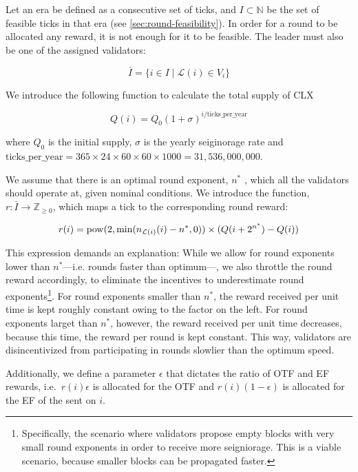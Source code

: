 Let an era be defined as a consecutive set of ticks, and $I\subset\mathbb{N}$ be the set of feasible ticks in that era (see \ref{sec:round-feasibility}). In order for a round to be allocated any reward, it is not enough for it to be feasible. The leader must also be one of the assigned validators:

\begin{equation}
\bar{I}=\{i\in I \mid \mathcal{L}(i) \in V_i\}
\end{equation}

We introduce the following function to calculate the total supply of CLX

\begin{equation}
Q(i) = Q_0 (1+\sigma)^{i/\text{ticks\_per\_year}}
\end{equation}

where $Q_0$ is the initial supply, $\sigma$ is the yearly seiginorage rate and $\text{ticks\_per\_year} = 365\times 24\times 60 \times 60 \times 1000 = 31,\!536,\!000,\!000$.


We assume that there is an optimal round exponent, $n^\ast$ , which all the validators should operate at, given nominal conditions. We introduce the function, $r:\bar{I}\to \mathbb{Z}_{\geq 0}$, which maps a tick to the corresponding round reward:

\begin{equation}
  r(i) = \operatorname*{pow}(2, {\min(n_{\mathcal{L}(i)}(i) - n^\ast, 0)}) \times (Q(i + 2^{n^\ast}) - Q(i))
\end{equation}

This expression demands an explanation: While we allow for round exponents lower than $n^\ast$---i.e. rounds faster than optimum---, we also throttle the round reward accordingly, to eliminate the incentives to underestimate round exponents\footnote{Specifically, the scenario where validators propose empty blocks with very small round exponents in order to receive more seigniorage. This is a viable scenario, because smaller blocks can be propagated faster.}. For round exponents smaller than $n^\ast$, the reward received per unit time is kept roughly constant owing to the factor on the left. For round exponents larget than $n^\ast$, however, the reward received per unit time decreases, because this time, the reward per round is kept constant. This way, validators are disincentivized from participating in rounds slowlier than the optimum speed.

Additionally, we define a parameter $\epsilon$ that dictates the ratio of OTF and EF rewards, i.e.~$r(i)\epsilon$ is allocated for the OTF and $r(i)(1-\epsilon)$ is allocated for the EF of the \PROP sent on $i$.

